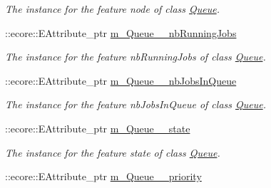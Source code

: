 \begin{DoxyCompactItemize}
\begin{DoxyCompactList}\small\item\em The instance for the feature node of class \hyperlink{classTMS__Data_1_1Queue}{Queue}. \item\end{DoxyCompactList}\item 
\hypertarget{classTMS__Data_1_1TMS__DataPackage_abd2cbe2f867c9a94c4da82320d990e96}{
::ecore::EAttribute\_\-ptr \hyperlink{classTMS__Data_1_1TMS__DataPackage_abd2cbe2f867c9a94c4da82320d990e96}{m\_\-Queue\_\-\_\-nbRunningJobs}}
\label{classTMS__Data_1_1TMS__DataPackage_abd2cbe2f867c9a94c4da82320d990e96}

\begin{DoxyCompactList}\small\item\em The instance for the feature nbRunningJobs of class \hyperlink{classTMS__Data_1_1Queue}{Queue}. \item\end{DoxyCompactList}\item 
\hypertarget{classTMS__Data_1_1TMS__DataPackage_a94ba4d97c9b7ae67f0156767aac0d4f9}{
::ecore::EAttribute\_\-ptr \hyperlink{classTMS__Data_1_1TMS__DataPackage_a94ba4d97c9b7ae67f0156767aac0d4f9}{m\_\-Queue\_\-\_\-nbJobsInQueue}}
\label{classTMS__Data_1_1TMS__DataPackage_a94ba4d97c9b7ae67f0156767aac0d4f9}

\begin{DoxyCompactList}\small\item\em The instance for the feature nbJobsInQueue of class \hyperlink{classTMS__Data_1_1Queue}{Queue}. \item\end{DoxyCompactList}\item 
\hypertarget{classTMS__Data_1_1TMS__DataPackage_af7e19a79a0e87f6944b389f97489185e}{
::ecore::EAttribute\_\-ptr \hyperlink{classTMS__Data_1_1TMS__DataPackage_af7e19a79a0e87f6944b389f97489185e}{m\_\-Queue\_\-\_\-state}}
\label{classTMS__Data_1_1TMS__DataPackage_af7e19a79a0e87f6944b389f97489185e}

\begin{DoxyCompactList}\small\item\em The instance for the feature state of class \hyperlink{classTMS__Data_1_1Queue}{Queue}. \item\end{DoxyCompactList}\item 
\hypertarget{classTMS__Data_1_1TMS__DataPackage_aa187f0af4c43e485f7a19b1353a71ba6}{
::ecore::EAttribute\_\-ptr \hyperlink{classTMS__Data_1_1TMS__DataPackage_aa187f0af4c43e485f7a19b1353a71ba6}{m\_\-Queue\_\-\_\-priority}}
\label{classTMS__Data_1_1TMS__DataPackage_aa187f0af4c43e485f7a19b1353a71ba6}


\end{DoxyCompactItemize}
